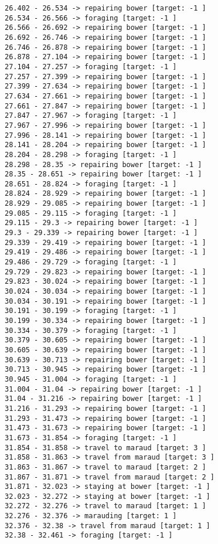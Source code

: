 \documentclass[11pt]{article}
\begin{document}
\begin{Verbatim}[commandchars=\\\{\}]
26.402 - 26.534 -> repairing bower [target: -1 ]
26.534 - 26.566 -> foraging [target: -1 ]
26.566 - 26.692 -> repairing bower [target: -1 ]
26.692 - 26.746 -> repairing bower [target: -1 ]
26.746 - 26.878 -> repairing bower [target: -1 ]
26.878 - 27.104 -> repairing bower [target: -1 ]
27.104 - 27.257 -> foraging [target: -1 ]
27.257 - 27.399 -> repairing bower [target: -1 ]
27.399 - 27.634 -> repairing bower [target: -1 ]
27.634 - 27.661 -> repairing bower [target: -1 ]
27.661 - 27.847 -> repairing bower [target: -1 ]
27.847 - 27.967 -> foraging [target: -1 ]
27.967 - 27.996 -> repairing bower [target: -1 ]
27.996 - 28.141 -> repairing bower [target: -1 ]
28.141 - 28.204 -> repairing bower [target: -1 ]
28.204 - 28.298 -> foraging [target: -1 ]
28.298 - 28.35 -> repairing bower [target: -1 ]
28.35 - 28.651 -> repairing bower [target: -1 ]
28.651 - 28.824 -> foraging [target: -1 ]
28.824 - 28.929 -> repairing bower [target: -1 ]
28.929 - 29.085 -> repairing bower [target: -1 ]
29.085 - 29.115 -> foraging [target: -1 ]
29.115 - 29.3 -> repairing bower [target: -1 ]
29.3 - 29.339 -> repairing bower [target: -1 ]
29.339 - 29.419 -> repairing bower [target: -1 ]
29.419 - 29.486 -> repairing bower [target: -1 ]
29.486 - 29.729 -> foraging [target: -1 ]
29.729 - 29.823 -> repairing bower [target: -1 ]
29.823 - 30.024 -> repairing bower [target: -1 ]
30.024 - 30.034 -> repairing bower [target: -1 ]
30.034 - 30.191 -> repairing bower [target: -1 ]
30.191 - 30.199 -> foraging [target: -1 ]
30.199 - 30.334 -> repairing bower [target: -1 ]
30.334 - 30.379 -> foraging [target: -1 ]
30.379 - 30.605 -> repairing bower [target: -1 ]
30.605 - 30.639 -> repairing bower [target: -1 ]
30.639 - 30.713 -> repairing bower [target: -1 ]
30.713 - 30.945 -> repairing bower [target: -1 ]
30.945 - 31.004 -> foraging [target: -1 ]
31.004 - 31.04 -> repairing bower [target: -1 ]
31.04 - 31.216 -> repairing bower [target: -1 ]
31.216 - 31.293 -> repairing bower [target: -1 ]
31.293 - 31.473 -> repairing bower [target: -1 ]
31.473 - 31.673 -> repairing bower [target: -1 ]
31.673 - 31.854 -> foraging [target: -1 ]
31.854 - 31.858 -> travel to maraud [target: 3 ]
31.858 - 31.863 -> travel from maraud [target: 3 ]
31.863 - 31.867 -> travel to maraud [target: 2 ]
31.867 - 31.871 -> travel from maraud [target: 2 ]
31.871 - 32.023 -> staying at bower [target: -1 ]
32.023 - 32.272 -> staying at bower [target: -1 ]
32.272 - 32.276 -> travel to maraud [target: 1 ]
32.276 - 32.376 -> marauding [target: 1 ]
32.376 - 32.38 -> travel from maraud [target: 1 ]
32.38 - 32.461 -> foraging [target: -1 ]

\end{Verbatim}
\end{document}
